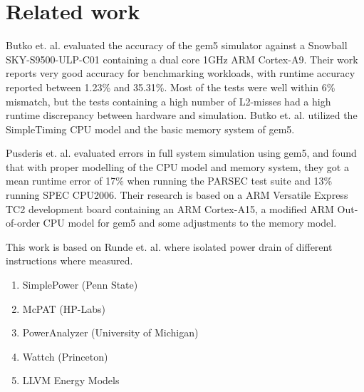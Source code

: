 \section{Related work}

Butko et. al.\cite{butko2012accuracy} evaluated the accuracy of the gem5
simulator against a Snowball SKY-S9500-ULP-C01 containing a dual core 1GHz ARM
Cortex-A9.  Their work reports very good accuracy for benchmarking workloads,
with runtime accuracy reported between 1.23\% and 35.31\%.  Most of the tests
were well within 6\% mismatch, but the tests containing a high number of
L2-misses had a high runtime discrepancy between hardware and simulation. Butko et. al.
utilized the SimpleTiming CPU model and the basic memory system of gem5.

Pusderis et. al. \cite{pusdesrissources} evaluated errors in full system
simulation using gem5, and found that with proper modelling of the CPU model
and memory system, they got a mean runtime error of 17\% when running the PARSEC
test suite and 13\% running SPEC CPU2006. Their research is based on a ARM
Versatile Express TC2 development board containing an ARM Cortex-A15, a modified
ARM Out-of-order CPU model for gem5 and some adjustments to the memory model.

This work is based on Runde et. al.\cite{rundehvatum2013exploring} where isolated
power drain of different instructions where measured.

\begin{enumerate}
    \item SimplePower (Penn State)
    \item McPAT (HP-Labs)
    \item PowerAnalyzer (University of Michigan)
    \item Wattch (Princeton)
    \item LLVM Energy Models
\end{enumerate}
